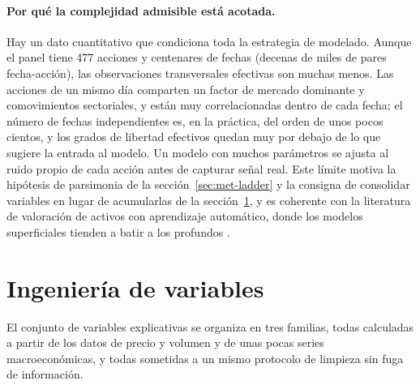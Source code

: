\paragraph{Por qué la complejidad admisible está acotada.} Hay un dato cuantitativo que
condiciona toda la estrategia de modelado. Aunque el panel tiene 477 acciones y centenares
de fechas (decenas de miles de pares fecha-acción), las observaciones transversales
efectivas son muchas menos. Las acciones de un mismo día comparten un factor de mercado
dominante y comovimientos sectoriales, y están muy correlacionadas dentro de cada fecha;
el número de fechas independientes es, en la práctica, del orden de unos pocos cientos,
y los grados de libertad efectivos quedan muy por debajo de lo que sugiere la entrada al
modelo. Un modelo con muchos parámetros se ajusta al ruido propio de cada acción antes de
capturar señal real. Este límite motiva la hipótesis de parsimonia de la
sección~\ref{sec:met-ladder} y la consigna de consolidar variables en lugar de
acumularlas de la sección~\ref{sec:met-variables}, y es coherente con la literatura de
valoración de activos con aprendizaje automático, donde los modelos superficiales tienden
a batir a los profundos \autocite{gu2020empirical}.

\section{Ingeniería de variables}\label{sec:met-variables}

El conjunto de variables explicativas se organiza en tres familias, todas calculadas a
partir de los datos de precio y volumen y de unas pocas series macroeconómicas, y todas
sometidas a un mismo protocolo de limpieza sin fuga de información.

